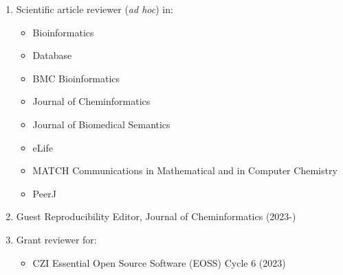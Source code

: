 \documentclass[10pt,a4paper,sans]{moderncv} %
\begin{document}
\begin{enumerate}
\item Scientific article reviewer (\textit{ad hoc}) in:
\begin{itemize}
    \item Bioinformatics
    \item Database
    \item BMC Bioinformatics
    \item Journal of Cheminformatics
    \item Journal of Biomedical Semantics
    \item eLife
    \item MATCH Communications in Mathematical and in Computer Chemistry
    \item PeerJ
\end{itemize}
\item Guest Reproducibility Editor, Journal of Cheminformatics (2023-)
\item Grant reviewer for:
\begin{itemize}
    \item CZI Essential Open Source Software (EOSS) Cycle 6 (2023)
\end{itemize}
\end{enumerate}
\end{document}
